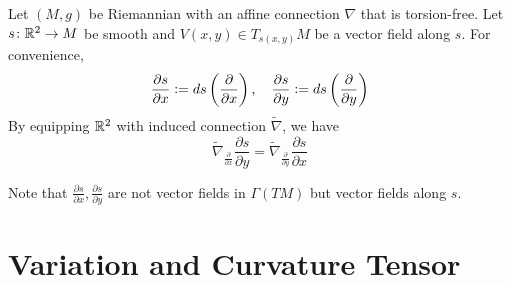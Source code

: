 \begin{enumerate}[label=\arabic{*}.]
	\begin{cor}
		Let $(M,g)$ be Riemannian with an affine connection $\nabla$ that is torsion-free. Let $s \colon \mathbb{R}^2 \rightarrow M$ be smooth and $V(x,y) \in T_{s(x,y)}M$ be a vector field along $s$. For convenience,
		\begin{equation*}
			\frac{\partial s}{\partial x} \vcentcolon= ds\left(\frac{\partial}{\partial x}\right),\quad \frac{\partial s}{\partial y} \vcentcolon= ds\left(\frac{\partial}{\partial y}\right)
		\end{equation*}
		By equipping $\mathbb{R}^2$ with induced connection $\widetilde{\nabla}$, we have
		\begin{equation*}
			\widetilde{\nabla}_{\frac{\partial}{\partial x}} \frac{\partial s}{\partial y} = \widetilde{\nabla}_{\frac{\partial}{\partial y}} \frac{\partial s}{\partial x}
		\end{equation*}
	\end{cor}
	\noindent Note that $\frac{\partial s}{\partial x},\frac{\partial s}{\partial y}$ are not vector fields in $\Gamma(TM)$ but vector fields along $s$.
\end{enumerate}

\section{Variation and Curvature Tensor}

